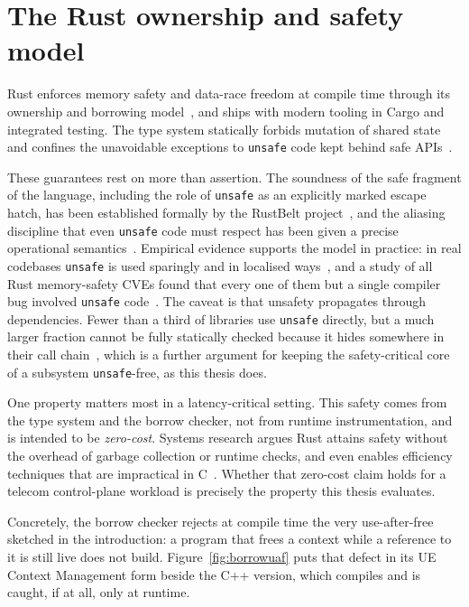 \documentclass[english,oneside,a4paper,censored,csm,software-track-2020]{HYthesisML}
\begin{document}
\section{The Rust ownership and safety model}
Rust enforces memory safety and data-race freedom at compile time through its ownership and
borrowing model~\cite{klabnik2023rust}, and ships with modern tooling in Cargo and integrated
testing. The type system statically forbids mutation of shared state and confines the
unavoidable exceptions to \texttt{unsafe} code kept behind safe APIs~\cite{jung2021safe}.

These guarantees rest on more than assertion. The soundness of the safe fragment of the
language, including the role of \texttt{unsafe} as an explicitly marked escape hatch, has
been established formally by the RustBelt project~\cite{jung2018rustbelt}, and the aliasing
discipline that even \texttt{unsafe} code must respect has been given a precise operational
semantics~\cite{jung2020stacked}. Empirical evidence supports the model in practice: in real
codebases \texttt{unsafe} is used sparingly and in localised
ways~\cite{qin2020rust,astrauskas2020unsafe}, and a study of all Rust memory-safety CVEs found
that every one of them but a single compiler bug involved \texttt{unsafe}
code~\cite{xu2021rustcve}. The caveat is that unsafety propagates through dependencies. Fewer
than a third of libraries use \texttt{unsafe} directly, but a much larger fraction cannot be
fully statically checked because it hides somewhere in their call
chain~\cite{evans2020rust}, which is a further argument for keeping the safety-critical core of a
subsystem \texttt{unsafe}-free, as this thesis does.

One property matters most in a latency-critical setting. This safety comes from the type system
and the borrow checker, not from runtime instrumentation, and is intended to be
\emph{zero-cost}. Systems research argues Rust attains safety without the overhead of garbage
collection or runtime checks, and even enables efficiency techniques that are impractical in
C~\cite{balasubramanian2017rust}. Whether that zero-cost claim holds for a telecom
control-plane workload is precisely the property this thesis evaluates.

Concretely, the borrow checker rejects at compile time the very use-after-free sketched in the
introduction: a program that frees a context while a reference to it is still live does not
build. Figure~\ref{fig:borrowuaf} puts that defect in its UE Context Management form beside the
C++ version, which compiles and is caught, if at all, only at runtime.
\end{document}

